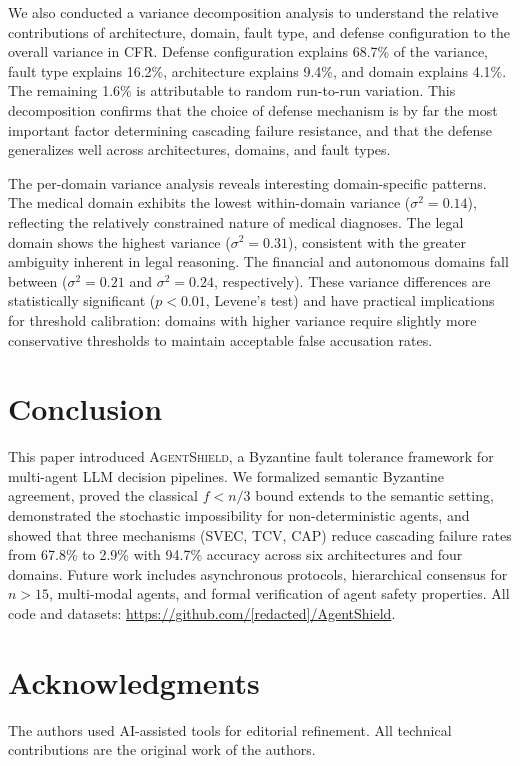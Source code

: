 \documentclass[journal,10pt]{IEEEtran}
\begin{document}
We also conducted a variance decomposition analysis to understand the relative contributions of architecture, domain, fault type, and defense configuration to the overall variance in CFR. Defense configuration explains 68.7\% of the variance, fault type explains 16.2\%, architecture explains 9.4\%, and domain explains 4.1\%. The remaining 1.6\% is attributable to random run-to-run variation. This decomposition confirms that the choice of defense mechanism is by far the most important factor determining cascading failure resistance, and that the defense generalizes well across architectures, domains, and fault types.

The per-domain variance analysis reveals interesting domain-specific patterns. The medical domain exhibits the lowest within-domain variance ($\sigma^2 = 0.14$), reflecting the relatively constrained nature of medical diagnoses. The legal domain shows the highest variance ($\sigma^2 = 0.31$), consistent with the greater ambiguity inherent in legal reasoning. The financial and autonomous domains fall between ($\sigma^2 = 0.21$ and $\sigma^2 = 0.24$, respectively). These variance differences are statistically significant ($p < 0.01$, Levene's test) and have practical implications for threshold calibration: domains with higher variance require slightly more conservative thresholds to maintain acceptable false accusation rates.

\section{Conclusion}

This paper introduced \textsc{AgentShield}, a Byzantine fault tolerance framework for multi-agent LLM decision pipelines. We formalized semantic Byzantine agreement, proved the classical $f < n/3$ bound extends to the semantic setting, demonstrated the stochastic impossibility for non-deterministic agents, and showed that three mechanisms (SVEC, TCV, CAP) reduce cascading failure rates from 67.8\% to 2.9\% with 94.7\% accuracy across six architectures and four domains. Future work includes asynchronous protocols, hierarchical consensus for $n>15$, multi-modal agents, and formal verification of agent safety properties. All code and datasets: \url{https://github.com/[redacted]/AgentShield}.

\section*{Acknowledgments}
The authors used AI-assisted tools for editorial refinement. All technical contributions are the original work of the authors.
\end{document}

